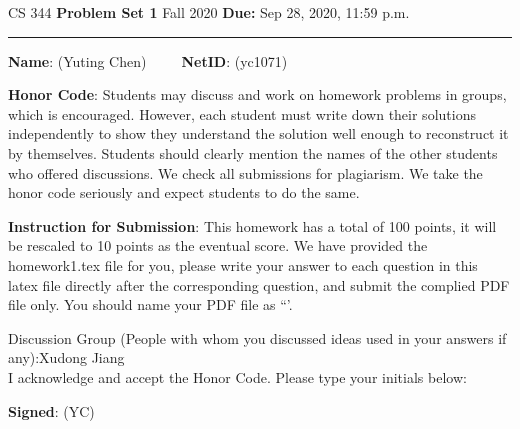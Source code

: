 \documentclass[12pt]{article}
\begin{document}
\noindent
CS 344 \hfill \textbf{Problem Set 1} \newline 
{Fall 2020} \hfill \textbf{Due:} Sep 28, 2020, 11:59 p.m.

\noindent
\rule{\linewidth}{0.4pt}

\vspace{.5cm}

\textbf{Name}: ({\color{blue}Yuting Chen})~~~~~\textbf{NetID}: ({\color{blue}yc1071})

\vspace{.5cm}

\textbf{Honor Code}: Students may discuss and work on homework problems in groups, which is encouraged. However, each student must write down their solutions independently to show they understand the solution well enough to reconstruct it by themselves.  Students should clearly mention the names of the other students who offered discussions. We check all submissions for plagiarism. We take the honor code seriously and expect students to do the same. 


\vspace{.5cm}

\textbf{Instruction for Submission}: This homework has a total of 100 points, it will be rescaled to 10 points as the eventual score. We have provided the homework1.tex file for you, please write your answer to each question in this latex file directly after the corresponding question, and submit the complied PDF file only. You should name your PDF file as ``{\color{blue}{Firstname-Lastname-NetID.pdf'}}'.

\hrulefill

Discussion Group (People with whom you discussed ideas used in your answers if any):Xudong Jiang    \\[1ex]


I acknowledge and accept the Honor Code. Please type your initials below:

\textbf{Signed}: ({\color{blue}YC})

\hrulefill


\end{document}
